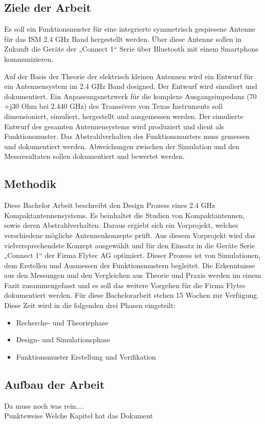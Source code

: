 \subsection{Ziele der Arbeit}
Es soll ein Funktionsmuster für eine integrierte symmetrisch gespiesene Antenne für das ISM 2.4 GHz Band hergestellt werden. Über diese Antenne sollen in Zukunft die Geräte der „Connect 1“ Serie über Bluetooth mit einem Smartphone kommunizieren. 

Auf der Basis der Theorie der elektrisch kleinen Antennen wird ein Entwurf für ein Antennensystem im 2.4 GHz Band designed. Der Entwurf wird simuliert und dokumentiert. 
Ein Anpassungsnetzwerk  für die komplexe Ausgangsimpedanz (70 +j30 Ohm bei 2.440 GHz) des Transsivers von Texas Instruments soll dimensioniert, simuliert, hergestellt und ausgemessen werden.
Der simulierte Entwurf des gesamten Antennensystems wird produziert und dient als Funktionsmuster. Das Abstrahlverhalten des Funktionsmusters muss gemessen und dokumentiert werden.
Abweichungen zwischen der Simulation und den Messresultaten sollen dokumentiert und bewertet werden.
\subsection{Methodik}
Diese Bachelor Arbeit beschreibt den Design Prozess eines 2.4 GHz Kompaktantennensystems. Es beinhaltet die Studien von Kompaktantennen, sowie deren Abstrahlverhalten. Daraus ergiebt sich ein  Vorprojekt, welches verschiedene mögliche Antennenkonzepte prüft. Aus diesem Vorprojekt wird das vielversprechendste Konzept ausgewählt und für den Einsatz in die Geräte Serie „Connect 1“ der Firma Flytec AG optimiert. Dieser Prozess ist von Simulationen, dem  Erstellen und Ausmessen der Funktionsmustern begleitet. Die Erkenntnisse aus den Messungen und den Vergleichen aus Theorie und Praxis werden im einem Fazit zusammengefasst und es soll das weitere Vorgehen für die Firma Flytec dokumentiert werden. Für diese Bachelorarbeit stehen 15 Wochen zur Verfügung. Diese Zeit wird in die folgenden drei Phasen eingeteilt:
\begin{itemize}
	\item Recherche- und Theoriephase
	\item Design- und Simulationsphase 
	\item Funktionsmuster Erstellung und Verifikation
\end{itemize}

\subsection{Aufbau der Arbeit}
Da muss noch was rein....\\
Punkteweise Welche Kapitel hat das Dokument




